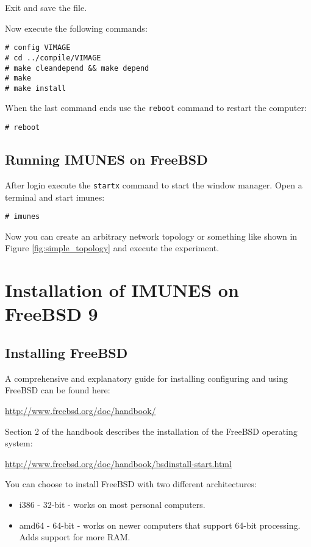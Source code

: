 Exit and save the file.

Now execute the following commands:
\begin{verbatim}
# config VIMAGE
# cd ../compile/VIMAGE
# make cleandepend && make depend
# make
# make install
\end{verbatim}

When the last command ends use the \texttt{reboot} command to restart the
computer:

\texttt{\# reboot}

\subsection{Running IMUNES on FreeBSD}

After login execute the \texttt{startx} command to start the window manager.
Open a terminal and start imunes:

\texttt{\# imunes}

Now you can create an arbitrary network topology or something like shown in
Figure \ref{fig:simple_topology} and execute the experiment.

\section{Installation of IMUNES on FreeBSD 9}

\subsection{Installing FreeBSD}
A comprehensive and explanatory guide for installing configuring and using
FreeBSD can be found here:

\begin{center}
\url{http://www.freebsd.org/doc/handbook/}
\end{center}

Section 2 of the handbook describes the installation of the FreeBSD operating
system: 
\begin{center}
\url{http://www.freebsd.org/doc/handbook/bsdinstall-start.html}
\end{center}

You can choose to install FreeBSD with two different architectures:
\begin{itemize}
\item i386 - 32-bit - works on most personal computers.
\item amd64 - 64-bit - works on newer computers that support 64-bit processing.
Adds support for more RAM.
\end{itemize}

